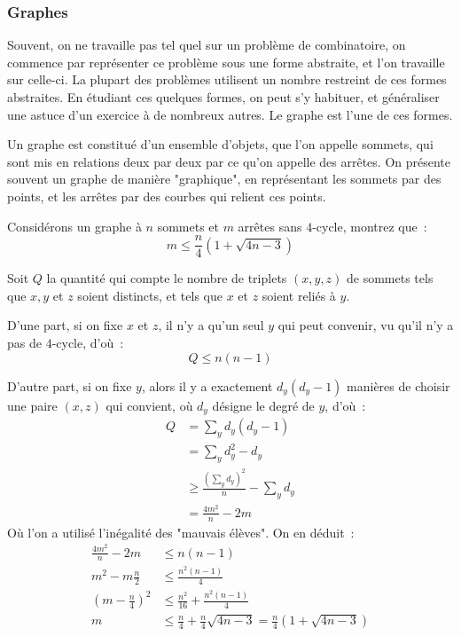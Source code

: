 \subsubsection{Graphes}

Souvent, on ne travaille pas tel quel sur un problème de combinatoire, on commence par représenter ce problème sous une forme abstraite, et l'on travaille sur celle-ci. La plupart des problèmes utilisent un nombre restreint de ces formes abstraites. En étudiant ces quelques formes, on peut s'y habituer, et généraliser une astuce d'un exercice à de nombreux autres. Le graphe est l'une de ces formes.

Un graphe est constitué d'un ensemble d'objets, que l'on appelle sommets, qui sont mis en relations deux par deux par ce qu'on appelle des arrêtes. On présente souvent un graphe de manière "graphique", en représentant les sommets par des points, et les arrêtes par des courbes qui relient ces points.

\begin{exo}
	Considérons un graphe à $n$ sommets et $m$ arrêtes sans $4$-cycle, montrez que~:
	$$m \leq \frac{n}{4}(1 + \sqrt{4n - 3})$$
\end{exo}
\begin{sol}
	Soit $Q$ la quantité qui compte le nombre de triplets $(x, y, z)$ de sommets tels que $x, y$ et $z$ soient distincts, et tels que $x$ et $z$ soient reliés à $y$.
	
	D'une part, si on fixe $x$ et $z$, il n'y a qu'un seul $y$ qui peut convenir, vu qu'il n'y a pas de $4$-cycle, d'où~:
	$$Q \leq n(n - 1)$$
	
	D'autre part, si on fixe $y$, alors il y a exactement $d_y(d_y - 1)$ manières de choisir une paire $(x, z)$ qui convient, où $d_y$ désigne le degré de $y$, d'où~:
	\begin{align*}
	Q &= \sum_y d_y(d_y - 1) \\
	&= \sum_y d_y^2 - d_y \\
	&\geq \frac{\left(\sum_y d_y\right)^2}{n} - \sum_y d_y \\
	&= \frac{4m^2}{n} - 2m
	\end{align*}
	Où l'on a utilisé l'inégalité des "mauvais élèves".
	On en déduit~:
	\begin{align*}
	\frac{4m^2}{n} - 2m &\leq n(n - 1) \\
	m^2 - m\frac{n}2 &\leq \frac{n^2(n - 1)}{4} \\
	\left (m - \frac{n}{4} \right )^2 &\leq \frac{n^2}{16} + \frac{n^2(n - 1)}{4} \\
	m &\leq \frac{n}{4} + \frac{n}{4} \sqrt{4n - 3} = \frac{n}{4}(1 + \sqrt{4n - 3})
	\end{align*}
\end{sol}

